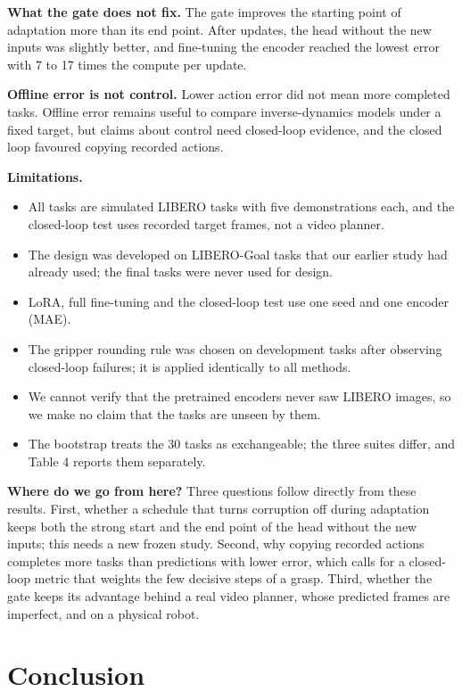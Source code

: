 \documentclass[10pt,twocolumn,letterpaper]{article}
\providecommand{\tightlist}{\setlength{\itemsep}{0pt}\setlength{\parskip}{0pt}}
\begin{document}
\textbf{What the gate does not fix.} The gate improves the starting point of adaptation more than its end point. After updates, the head without the new inputs was slightly better, and fine-tuning the encoder reached the lowest error with 7 to 17 times the compute per update.

\textbf{Offline error is not control.} Lower action error did not mean more completed tasks. Offline error remains useful to compare inverse-dynamics models under a fixed target, but claims about control need closed-loop evidence, and the closed loop favoured copying recorded actions.

\textbf{Limitations.}

\begin{itemize}
\tightlist
\item
  All tasks are simulated LIBERO tasks with five demonstrations each, and the closed-loop test uses recorded target frames, not a video planner.
\item
  The design was developed on LIBERO-Goal tasks that our earlier study had already used; the final tasks were never used for design.
\item
  LoRA, full fine-tuning and the closed-loop test use one seed and one encoder (MAE).
\item
  The gripper rounding rule was chosen on development tasks after observing closed-loop failures; it is applied identically to all methods.
\item
  We cannot verify that the pretrained encoders never saw LIBERO images, so we make no claim that the tasks are unseen by them.
\item
  The bootstrap treats the 30 tasks as exchangeable; the three suites differ, and Table 4 reports them separately.
\end{itemize}

\textbf{Where do we go from here?} Three questions follow directly from these results. First, whether a schedule that turns corruption off during adaptation keeps both the strong start and the end point of the head without the new inputs; this needs a new frozen study. Second, why copying recorded actions completes more tasks than predictions with lower error, which calls for a closed-loop metric that weights the few decisive steps of a grasp. Third, whether the gate keeps its advantage behind a real video planner, whose predicted frames are imperfect, and on a physical robot.

\section{Conclusion}
\end{document}
